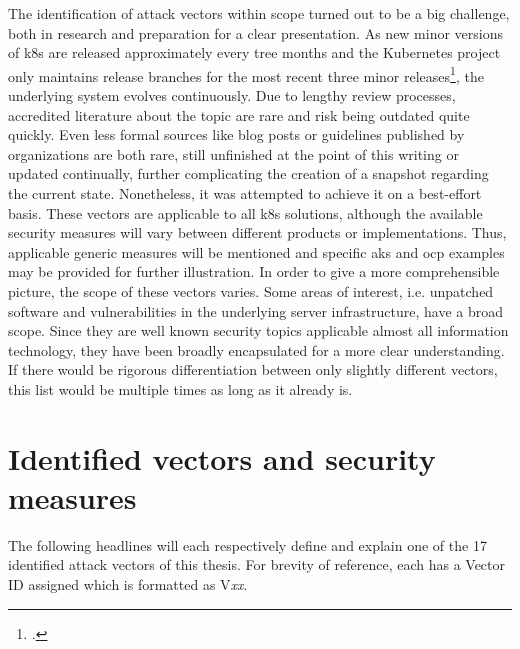 The identification of attack vectors within scope turned out to be a big challenge, both in research and preparation for a clear presentation. 
As new minor versions of \gls{k8s} are released approximately every tree months and the Kubernetes project only maintains release branches for the most recent three minor releases\footcite[][, section 'Supported versions']{k8sSupport}, the underlying system evolves continuously. Due to lengthy review processes, accredited literature about the topic are rare and risk being outdated quite quickly. Even less formal sources like blog posts or guidelines published by organizations are both rare, still unfinished at the point of this writing or updated continually, further complicating the creation of a snapshot regarding the current state. Nonetheless, it was attempted to achieve it on a best-effort basis.
These vectors are applicable to all \gls{k8s} solutions, although the available security measures will vary between different products or implementations. Thus, applicable  generic measures will be mentioned and specific \gls{aks} and \gls{ocp} examples may be provided for further illustration.
In order to give a more comprehensible picture, the scope of these vectors varies. Some areas of interest, i.e. unpatched software and vulnerabilities in the underlying server  infrastructure, have a broad scope. Since they are well known security topics applicable almost all information technology, they have been broadly encapsulated for a more clear understanding. If there would be rigorous differentiation between only slightly different vectors, this list would be multiple times as long as it already is.


\section{Identified vectors and security measures} \label{vectorIdentify}
The following headlines will each respectively define and explain one of the 17 identified attack vectors of this thesis. For brevity of reference, each has a Vector ID assigned which is formatted as V\textit{xx}.

	
